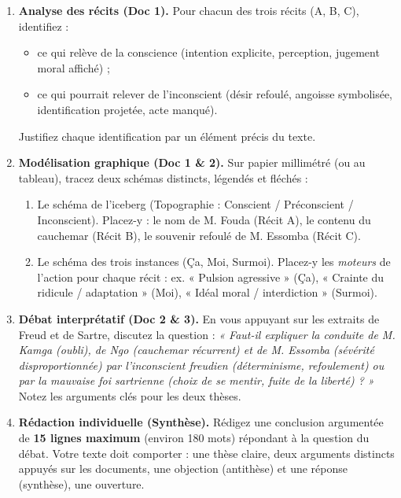 \documentclass[11pt]{article}
\newcommand{\cle}[1]{{\popxbold\color{popdark}#1}}
\begin{document}
\begin{enumerate}
    \item \textbf{Analyse des récits (Doc 1).} Pour chacun des trois récits (A, B, C), identifiez : 
    \begin{itemize}
        \item ce qui relève de la \cle{conscience} (intention explicite, perception, jugement moral affiché) ;
        \item ce qui pourrait relever de l'\cle{inconscient} (désir refoulé, angoisse symbolisée, identification projetée, acte manqué).
    \end{itemize}
    Justifiez chaque identification par un élément précis du texte.
    
    \item \textbf{Modélisation graphique (Doc 1 \& 2).} Sur papier millimétré (ou au tableau), tracez deux schémas distincts, légendés et fléchés :
    \begin{enumerate}
        \item Le schéma de l'\cle{iceberg} (Topographie : Conscient / Préconscient / Inconscient). Placez-y : le nom de M. Fouda (Récit A), le contenu du cauchemar (Récit B), le souvenir refoulé de M. Essomba (Récit C).
        \item Le schéma des \cle{trois instances} (Ça, Moi, Surmoi). Placez-y les \emph{moteurs} de l'action pour chaque récit : ex. « Pulsion agressive » (Ça), « Crainte du ridicule / adaptation » (Moi), « Idéal moral / interdiction » (Surmoi).
    \end{enumerate}
    
    \item \textbf{Débat interprétatif (Doc 2 \& 3).} En vous appuyant sur les extraits de Freud et de Sartre, discutez la question : 
    \emph{« Faut-il expliquer la conduite de M. Kamga (oubli), de Ngo (cauchemar récurrent) et de M. Essomba (sévérité disproportionnée) par l'inconscient freudien (déterminisme, refoulement) ou par la mauvaise foi sartrienne (choix de se mentir, fuite de la liberté) ? »}
    Notez les arguments clés pour les deux thèses.
    
    \item \textbf{Rédaction individuelle (Synthèse).} Rédigez une conclusion argumentée de \textbf{15 lignes maximum} (environ 180 mots) répondant à la question du débat. Votre texte doit comporter : une thèse claire, deux arguments distincts appuyés sur les documents, une objection (antithèse) et une réponse (synthèse), une ouverture.
\end{enumerate}
\end{document}
